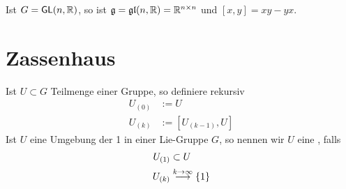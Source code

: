 \documentclass{book}
\newcommand{\g}{\mathfrak{g}}
\newcommand{\GL}{\textsf{GL}(n,\R)}
\newcommand{\glf}{\mathfrak{gl}(n,\R)}
\begin{document}
\Bem{}
Ist $G = \GL$, so ist $\g = \glf = \R^{n\times n}$ und $[x,y] = xy -yx$. 



\section{Zassenhaus}
\Def{}
Ist $U \subset G$ Teilmenge einer Gruppe, so definiere rekursiv
\begin{align*}
U_{(0)} &:= U\\
U_{(k)} &:= [U_{(k-1)}, U]
\end{align*}
Ist $U$ eine Umgebung der 1 in einer Lie-Gruppe $G$, so nennen wir $U$ eine , falls
\begin{align*}
U_{(1)} &\subset U\\
U_{(k)} &\overset{k \overset{{}}{\rightarrow} \infty}{\longrightarrow} \{1\}
\end{align*}
\end{document}
